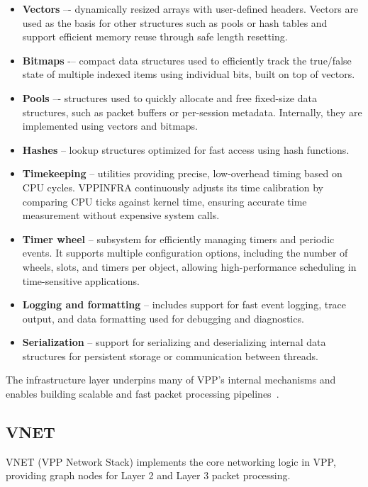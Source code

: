 \begin{itemize}
  \item \textbf{Vectors} –- dynamically resized arrays with user-defined headers. Vectors are used as the basis for other structures such as pools or hash tables and support efficient memory reuse through safe length resetting.

  \item \textbf{Bitmaps} -–  compact data structures used to efficiently track the true/false state of multiple indexed items using individual bits, built on top of vectors.

  \item \textbf{Pools} –- structures used to quickly allocate and free fixed-size data structures, such as packet buffers or per-session metadata. Internally, they are implemented using vectors and bitmaps. 

  \item \textbf{Hashes} -- lookup structures optimized for fast access using hash functions. 

  \item \textbf{Timekeeping} -- utilities providing precise, low-overhead timing based on CPU cycles. VPPINFRA continuously adjusts its time calibration by comparing CPU ticks against kernel time, ensuring accurate time measurement without expensive system calls.

  \item \textbf{Timer wheel} -- subsystem for efficiently managing timers and periodic events. It supports multiple configuration options, including the number of wheels, slots, and timers per object, allowing high-performance scheduling in time-sensitive applications.

  \item \textbf{Logging and formatting} -- includes support for fast event logging, trace output, and data formatting used for debugging and diagnostics.

  \item \textbf{Serialization} -- support for serializing and deserializing internal data structures for persistent storage or communication between threads.
\end{itemize}

The infrastructure layer underpins many of VPP’s internal mechanisms and enables building scalable and fast packet processing pipelines~\cite{fdio-vpp-infrastructure-2506}.

\subsection{VNET}
VNET (VPP Network Stack) implements the core networking logic in VPP, providing graph nodes for Layer 2 and Layer 3 packet processing.

